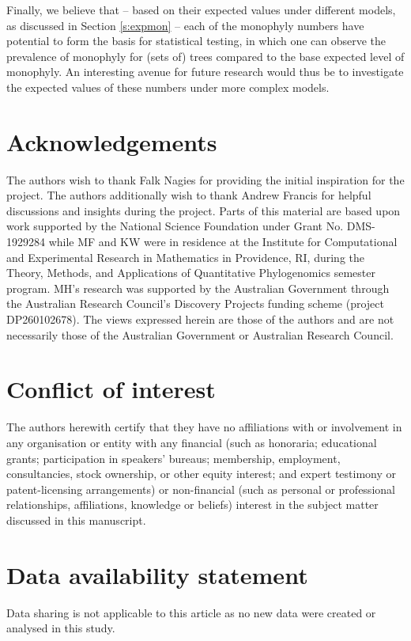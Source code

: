 \documentclass{amsart}
\theoremstyle{definition}
\begin{document}
Finally, we believe that -- based on their expected values under different models, as discussed in Section \ref{s:expmon} -- each of the monophyly numbers have potential to form the basis for statistical testing, in which one can observe the prevalence of monophyly for (sets of) trees compared to the base expected level of monophyly. An interesting avenue for future research would thus be to investigate the expected values of these numbers under more complex models. 

\section*{Acknowledgements} 
The authors wish to thank Falk Nagies for providing the initial inspiration for the project. The authors additionally wish to thank Andrew Francis for helpful discussions and insights during the project. 
Parts of this material are based upon work supported by the National Science Foundation under Grant No. DMS-1929284 while MF and KW were in residence at the Institute for Computational and Experimental Research in Mathematics in Providence, RI, during the Theory, Methods, and Applications of Quantitative Phylogenomics semester program. MH's research was supported by the Australian Government through the Australian Research Council's Discovery Projects funding scheme (project DP260102678). The views expressed herein are those of the authors and are not necessarily those of the Australian Government or Australian Research Council.


\section*{Conflict of interest} The authors herewith certify that they have no affiliations with or involvement in any
organisation or entity with any financial (such as honoraria; educational grants; participation in speakers’ bureaus;
membership, employment, consultancies, stock ownership, or other equity interest; and expert testimony or patent-licensing
arrangements) or non-financial (such as personal or professional relationships, affiliations, knowledge or beliefs) interest in the subject matter discussed in this manuscript.

\section*{Data availability statement} 
Data sharing is not applicable to this article as no new data were created or analysed in this study.


   
\end{document}

